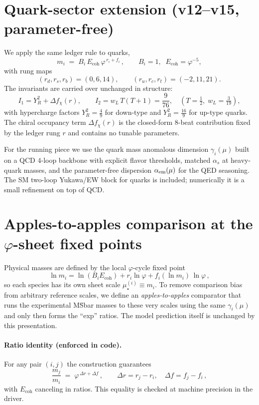 \documentclass[12pt]{article}
\begin{document}
\section*{Quark-sector extension (v12--v15, parameter-free)}
We apply the same ledger rule to quarks,
\[
m_i \;=\; B_i\,E_{\mathrm{coh}}\,\varphi^{\,r_i+f_i}\,,\qquad
B_i=1,\;\;E_{\mathrm{coh}}=\varphi^{-5},
\]
with rung maps
\[
(r_d,r_s,r_b)=(0,6,14),\qquad (r_u,r_c,r_t)=(-2,11,21).
\]
The invariants are carried over unchanged in structure: 
\[
I_1 = Y_R^2 + \Delta f_\chi(r),\qquad 
I_2 = w_L\,T(T{+}1)=\frac{9}{76},\quad (T=\tfrac12,\;w_L=\tfrac3{19}),
\]
with hypercharge factors $Y_R^2=\tfrac{4}{9}$ for down-type and $Y_R^2=\tfrac{16}{9}$ for up-type quarks. The chiral occupancy term $\Delta f_\chi(r)$ is the closed-form $8$-beat contribution fixed by the ledger rung $r$ and contains no tunable parameters.

For the running piece we use the quark mass anomalous dimension $\gamma_i(\mu)$ built on a QCD $4$-loop backbone with explicit flavor thresholds, matched $\alpha_s$ at heavy-quark masses, and the parameter-free dispersion $\alpha_{\rm em}(\mu)$ for the QED seasoning. The SM two-loop Yukawa/EW block for quarks is included; numerically it is a small refinement on top of QCD.

\section*{Apples-to-apples comparison at the $\varphi$-sheet fixed points}
Physical masses are defined by the local $\varphi$-cycle fixed point
\[
\ln m_i = \ln(B_iE_{\mathrm{coh}}) + r_i\ln\varphi + f_i(\ln m_i)\,\ln\varphi\,,
\]
so each species has its own sheet scale $\mu_\star^{(i)} \equiv m_i$. To remove comparison bias from arbitrary reference scales, we define an \emph{apples-to-apples} comparator that runs the experimental MS\={ }bar masses to these very scales using the same $\gamma_i(\mu)$ and only then forms the ``exp'' ratios. The model prediction itself is unchanged by this presentation. 

\paragraph{Ratio identity (enforced in code).} 
For any pair $(i,j)$ the construction guarantees
\[
\frac{m_j}{m_i}\;=\;\varphi^{\,\Delta r + \Delta f}\,,\qquad
\Delta r=r_j-r_i,\quad \Delta f=f_j-f_i\,,
\]
with $E_{\mathrm{coh}}$ canceling in ratios. This equality is checked at machine precision in the driver.
\end{document}
